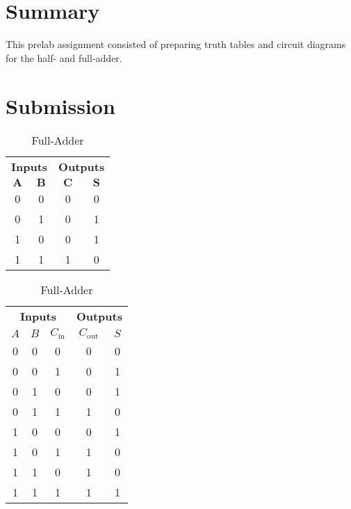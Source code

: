 \documentclass[11pt, letterpaper]{article} %
\begin{document}
\makelabtitle
  
\section*{Summary}

This prelab assignment consisted of preparing truth tables and circuit diagrams for the half- and full-adder.

\section*{Submission}

\begin{table}[h]\centering
    \caption{Prelab Truth Tables.}
    \def\arraystretch{1.2}
    \begin{subtable}[t]{0.48\linewidth}\centering
        \caption{Half-Adder}
        \begin{tabular}{|cc|cc|}
            \hline
            \multicolumn{2}{|m{1.5cm}|}{\bfseries\centering Inputs} & 
            \multicolumn{2}{m{1.5cm}|}{\bfseries\centering Outputs}\\
            $\boldsymbol{A}$ & $\boldsymbol{B}$ & $\boldsymbol{C}$ & $\boldsymbol{S}$\\
            \hline
            0 & 0 & 0 & 0\\
            0 & 1 & 0 & 1\\
            1 & 0 & 0 & 1\\
            1 & 1 & 1 & 0\\
            \hline
        \end{tabular}
    \end{subtable}
    \hfill\null
    \begin{subtable}[t]{0.48\linewidth}\centering
        \caption{Full-Adder}
        \begin{tabular}{|ccc|cc|}
            \hline
            \multicolumn{3}{|m{2.25cm}|}{\bfseries\centering Inputs} & 
            \multicolumn{2}{m{1.5cm}|}{\bfseries\centering Outputs}\\
            $A$ & $B$ &  $C_\mathrm{in}$ & $C_\mathrm{out}$ & $S$\\
            \hline
            0 & 0 & 0 & 0 & 0\\
            0 & 0 & 1 & 0 & 1\\
            0 & 1 & 0 & 0 & 1\\
            0 & 1 & 1 & 1 & 0\\
            1 & 0 & 0 & 0 & 1\\
            1 & 0 & 1 & 1 & 0\\
            1 & 1 & 0 & 1 & 0\\
            1 & 1 & 1 & 1 & 1\\
            \hline
        \end{tabular}
    \end{subtable}
\end{table}
\end{document}
